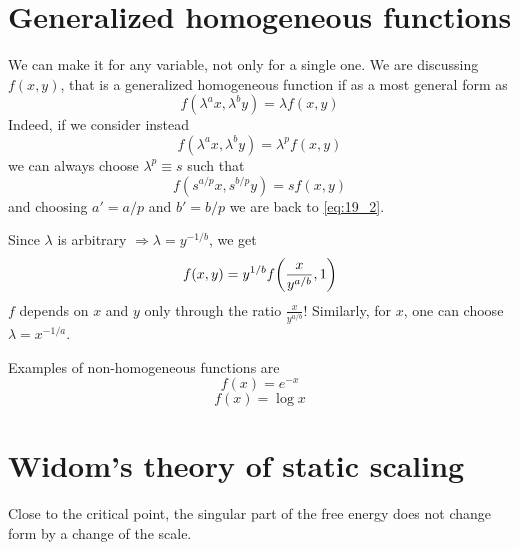 \documentclass[../main/main.tex]{subfiles}
\begin{document}
\section{Generalized homogeneous functions}
We can make it for any variable, not only for a single one.
We are discussing \( f(x,y) \), that is a generalized homogeneous function if as a most general form as
\begin{equation}
  f (\lambda ^a x, \lambda ^b y) = \lambda f(x,y)
  \label{eq:19_2}
\end{equation}
Indeed, if we consider instead
\begin{equation}
    f (\lambda ^a x, \lambda ^b y) = \lambda^p f(x,y)
\end{equation}
we can always choose \( \lambda ^p \equiv s \) such that
\begin{equation}
  f ( s^{a/p} x, s^{b/p} y) = s f(x,y)
\end{equation}
and choosing \( a'=a/p \) and \( b'=b/p \) we are back to \eqref{eq:19_2}.
\begin{remark}
Since \( \lambda  \) is arbitrary \( \Rightarrow \lambda  = y ^{-1/b} \), we get
\begin{equation}
  f(x,y) = y^{1/b} f \qty( \frac{x}{y^{a/b}},1)
\end{equation}
\( f \) depends on \( x \) and \( y \) only through the ratio \( \frac{x}{y^{a/b}} \)! Similarly, for \( x \), one can choose \( \lambda = x^{-1/a} \).
\end{remark}
\begin{example}{}{}
Examples of non-homogeneous functions are
\begin{equation}
  f(x) = e^{-x}
\end{equation}
\begin{equation}
  f(x) = \log{x}
\end{equation}
\end{example}

\section{Widom's theory of static scaling}
Close to the critical point, the singular part of the free energy does not change form by a change of the scale.
\end{document}
